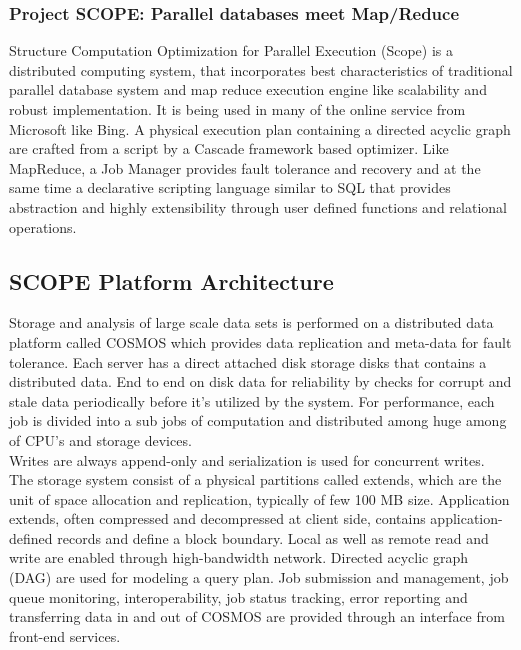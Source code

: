 \documentclass[runningheads,a4paper]{llncs}
\begin{document}
\subsubsection{Project SCOPE: Parallel databases meet Map/Reduce}
Structure Computation Optimization for Parallel Execution (Scope) is a distributed computing system, that incorporates best characteristics of traditional parallel database system and map reduce execution engine like scalability and robust implementation. It is being used in many of the online service from Microsoft like Bing. A physical execution plan containing a directed acyclic graph are crafted from a script by a Cascade framework based optimizer.  Like MapReduce, a Job Manager provides fault tolerance and recovery and at the same time a declarative scripting language similar to SQL that provides abstraction and highly extensibility through user defined functions and relational operations.\\

\subsection*{SCOPE Platform Architecture}
Storage and analysis of large scale data sets is performed on a distributed data platform called COSMOS which provides data replication and meta-data for fault tolerance. Each server has a direct attached disk storage disks that contains a distributed data. End to end on disk data for reliability by checks for corrupt and stale data periodically before it's utilized by the system. For performance, each job is divided into a sub jobs of computation and distributed among huge among of CPU's and storage devices.\\

Writes are always append-only and serialization is used for concurrent writes. The storage system consist of a physical partitions called extends, which are the unit of space allocation and replication, typically of few 100 MB size. Application extends, often compressed and decompressed at client side, contains application-defined records and define a block boundary. Local as well as remote read and write are enabled through high-bandwidth network. Directed acyclic graph (DAG) are used for modeling a query plan. Job submission and management, job queue monitoring, interoperability, job status tracking, error reporting and transferring data in and out of COSMOS are provided through an interface from front-end services.\\
\end{document}
